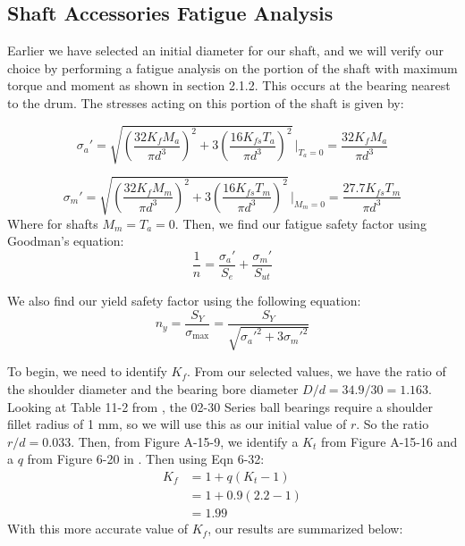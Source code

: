 \documentclass[letterpaper,12pt]{article}
\begin{document}
\subsection{Shaft Accessories Fatigue Analysis}

Earlier we have selected an initial diameter for our shaft, and we will verify our choice by performing a fatigue analysis on the portion of the shaft with maximum torque and moment as shown in section 2.1.2. This occurs at the bearing nearest to the drum. The stresses acting on this portion of the shaft is given by:

\begin{equation*}
    \sigma_a' = \sqrt{\left(\frac{32K_f M_a}{\pi d^3}\right)^2 + 3\left(\frac{16K_{fs} T_a}{\pi d^3}\right)^2}\, \bigg\rvert_{T_a = 0} = \frac{32K_f M_a}{\pi d^3}
\end{equation*}

\begin{equation*}
    \sigma_m' = \sqrt{\left(\frac{32K_f M_m}{\pi d^3}\right)^2 + 3\left(\frac{16K_{fs} T_m}{\pi d^3}\right)^2}\, \bigg\rvert_{M_m = 0} = \frac{27.7 K_{fs} T_m}{\pi d^3}
\end{equation*}
Where for shafts $M_m = T_a = 0$. Then, we find our fatigue safety factor using Goodman's equation:
\begin{equation*}
    \frac{1}{n} = \frac{\sigma_a'}{S_e} + \frac{\sigma_m'}{S_{ut}}
\end{equation*}

\noindent We also find our yield safety factor using the following equation:
\begin{equation*}
    n_y = \frac{S_Y}{\sigma_{\text{max}}} = \frac{S_Y}{\sqrt{\sigma_a'^2 + 3\sigma_m'^2}}
\end{equation*}

\noindent To begin, we need to identify $K_f$. From our selected values, we have the ratio of the shoulder diameter and the bearing bore diameter $D/d = 34.9/30 = 1.163$. Looking at Table 11-2 from \cite{shigley}, the 02-30 Series ball bearings require a shoulder fillet radius of 1 mm, so we will use this as our initial value of $r$. So the ratio $r/d = 0.033$. Then, from Figure A-15-9, we identify a $K_t$ from Figure A-15-16 and a $q$ from Figure 6-20 in \cite{shigley}. Then using Eqn 6-32:
\begin{align*}
    K_f &= 1 + q(K_t - 1)\\
    &= 1 + 0.9(2.2 - 1)\\
    &= 1.99
\end{align*}
With this more accurate value of $K_f$, our results are summarized below:
\end{document}
